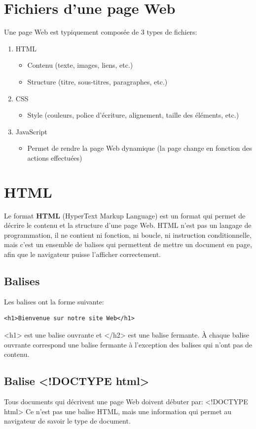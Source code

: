 \documentclass[a4paper,11pt]{article}
\begin{document}
\section{Fichiers d'une page Web}
Une page Web est typiquement composée de 3 types de fichiers:
\begin{enumerate}[label=\arabic*)]
\item HTML
\begin{itemize}
  \item Contenu (texte, images, liens, etc.)
  \item Structure (titre, sous-titres, paragraphes, etc.)
\end{itemize}
\item CSS
\begin{itemize}
  \item Style (couleurs, police d'écriture, alignement, taille des éléments, etc.)
\end{itemize}
\item JavaScript
\begin{itemize}
  \item Permet de rendre la page Web dynamique (la page change en fonction des actions effectuées)
\end{itemize}
\end{enumerate}

\section{HTML}
Le format \textbf{HTML} (HyperText Markup Language) est un format qui permet de décrire le contenu et la structure d'une page Web. HTML n'est pas un langage de programmation, il ne contient ni fonction, ni boucle, ni instruction conditionnelle, mais c'est un ensemble de balises qui permettent de mettre un document en page, afin que le navigateur puisse l'afficher correctement.

\subsection{Balises}
Les balises ont la forme suivante:
\begin{lstlisting}
<h1>Bienvenue sur notre site Web</h1>
\end{lstlisting}
<h1> est une balise ouvrante et </h2> est une balise fermante. À chaque balise ouvrante correspond une balise fermante à l'exception des balises qui n'ont pas de contenu.

\subsection{Balise <!DOCTYPE html>}
Tous documents qui décrivent une page Web doivent débuter par:  <!DOCTYPE html>
Ce n'est pas une balise HTML, mais une information qui permet au navigateur de savoir le type de document.
\end{document}
